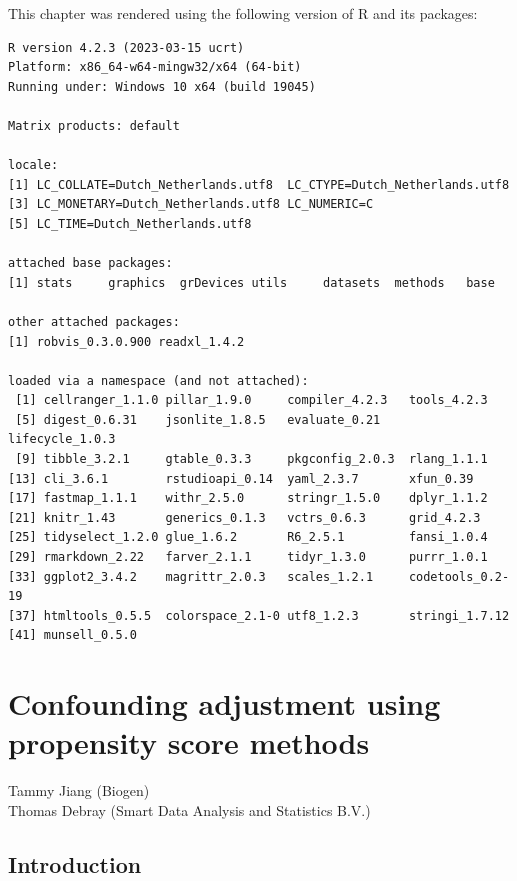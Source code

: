 \documentclass[
  letterpaper,
  DIV=11,
  numbers=noendperiod]{scrreprt}
\begin{document}

This chapter was rendered using the following version of R and its
packages:

\begin{verbatim}
R version 4.2.3 (2023-03-15 ucrt)
Platform: x86_64-w64-mingw32/x64 (64-bit)
Running under: Windows 10 x64 (build 19045)

Matrix products: default

locale:
[1] LC_COLLATE=Dutch_Netherlands.utf8  LC_CTYPE=Dutch_Netherlands.utf8   
[3] LC_MONETARY=Dutch_Netherlands.utf8 LC_NUMERIC=C                      
[5] LC_TIME=Dutch_Netherlands.utf8    

attached base packages:
[1] stats     graphics  grDevices utils     datasets  methods   base     

other attached packages:
[1] robvis_0.3.0.900 readxl_1.4.2    

loaded via a namespace (and not attached):
 [1] cellranger_1.1.0 pillar_1.9.0     compiler_4.2.3   tools_4.2.3     
 [5] digest_0.6.31    jsonlite_1.8.5   evaluate_0.21    lifecycle_1.0.3 
 [9] tibble_3.2.1     gtable_0.3.3     pkgconfig_2.0.3  rlang_1.1.1     
[13] cli_3.6.1        rstudioapi_0.14  yaml_2.3.7       xfun_0.39       
[17] fastmap_1.1.1    withr_2.5.0      stringr_1.5.0    dplyr_1.1.2     
[21] knitr_1.43       generics_0.1.3   vctrs_0.6.3      grid_4.2.3      
[25] tidyselect_1.2.0 glue_1.6.2       R6_2.5.1         fansi_1.0.4     
[29] rmarkdown_2.22   farver_2.1.1     tidyr_1.3.0      purrr_1.0.1     
[33] ggplot2_3.4.2    magrittr_2.0.3   scales_1.2.1     codetools_0.2-19
[37] htmltools_0.5.5  colorspace_2.1-0 utf8_1.2.3       stringi_1.7.12  
[41] munsell_0.5.0   
\end{verbatim}


\hypertarget{confounding-adjustment-using-propensity-score-methods}{%
\chapter{Confounding adjustment using propensity score
methods}\label{confounding-adjustment-using-propensity-score-methods}}

Tammy Jiang (Biogen)\\
Thomas Debray (Smart Data Analysis and Statistics B.V.)

\hfill\break

\hypertarget{introduction}{%
\section{Introduction}\label{introduction}}
\end{document}
